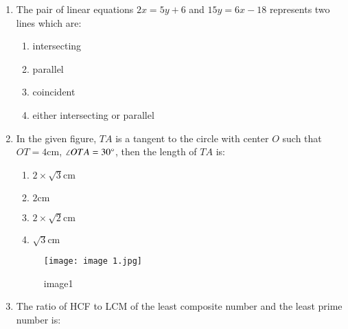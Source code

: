 \documentclass[12pt,-letter paper]{article}
\begin{document}
\begin{enumerate}
    \item The pair of linear equations $2x = 5y + 6$ and $15y = 6x - 18$ represents two lines which are:
    \begin{enumerate}
        \item intersecting
        \item parallel
        \item coincident
        \item either intersecting or parallel
    \end{enumerate}
    
    \item In the given figure, $TA$ is a tangent to the circle with center $O$ such that $OT = 4\mathrm{cm}$, $\angle OTA = 30\degree$, then the length of $TA$ is:
    \begin{enumerate}
        \item $2 \times \sqrt{3} \mathrm{cm}$
        \item $2\mathrm{cm}$
        \item $2 \times \sqrt{2}\mathrm{cm}$
        \item $\sqrt{3}\mathrm{cm}$
    \end{enumerate}
\begin{figure}[!ht]
\centering
\texttt{[image: image 1.jpg]}
\label{fig:image1}
	\caption{image1}
\end{figure}

\item The ratio of HCF to LCM of the least composite number and the least prime number is:


\end{enumerate}
\end{document}
